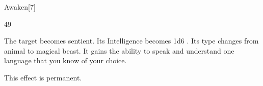 \begin{spellsection}{Awaken}[7]

\begin{spellcontent}

\begin{spelltargetinginfo}


 49
\end{spelltargetinginfo}


\begin{spelleffects}



\spelleffect
The target becomes sentient.
Its Intelligence becomes 1d6 .
Its type changes from animal to magical beast.
It gains the ability to speak and understand one language that you know of your choice.

This effect is permanent.








\end{spelleffects}

\end{spellcontent}
\begin{spellfooter}


\end{spellfooter}
\begin{spellsubcontent}


\end{spellsubcontent}
\end{spellsection}


